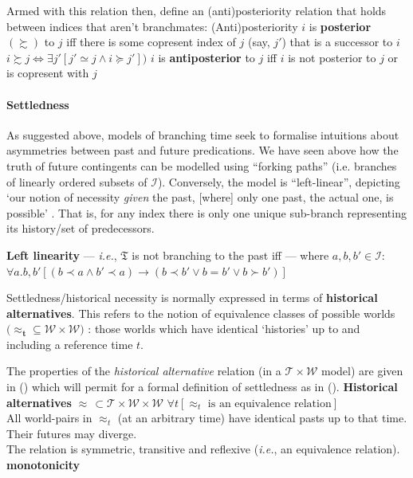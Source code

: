 \documentclass[12pt,dvipsnames]{report}
\begin{document}
Armed with this relation then, \citeauthor{Thomason1980} define an (anti)posteriority relation that holds between indices that aren't branchmates:
\pex (Anti)posteriority \citep[311]{Thomason1980}
\a $ i $ is \textbf{posterior} $ (\boldsymbol\succsim )$ to $ j $ iff there is some copresent index of $ j $ (say, $ j' $) that is a successor to $ i $ \hfill
$i \boldsymbol\succsim j\Leftrightarrow\exists j'[j'\simeq j\wedge i\succcurlyeq j'] )$
\a $ i $ is \textbf{antiposterior} to $ j $ iff $ i $ is not posterior to $ j $ or is copresent with $ j $ \\
\xe

\paragraph{Settledness} As suggested above, models of branching time seek to formalise intuitions about asymmetries between past and future predications. We have seen above how the truth of future contingents can be modelled using ``forking paths'' (i.e. branches of linearly ordered subsets of $ \mathcal I $). Conversely, the model is ``left-linear'', depicting `our notion of necessity \textit{given} the past, [where] only one past, the actual one, is possible' \citep[159]{Burgess1978}. That is, for any index there is only one unique sub-branch representing its history/set of predecessors.\label{par:settledness}

\ex {} \textbf{Left linearity }--- \textit{i.e.}, $ \mathfrak T $ is not branching to the past iff --- where $ a,b,b'\in\mathcal I: $\\
$ \forall a.b,b'[(b\prec a\wedge b'\prec a)\to(b\prec b'\vee b=b'\vee b\succ b')] $\xe

Settledness/historical necessity is normally expressed in terms of \textbf{historical alternatives}. This refers to the notion of equivalence classes of possible worlds $\boldsymbol{(\approx_{t}}\subseteq\mathcal{W\times W})$ : those worlds which have identical `histories' up to and including a reference time $t$. 

The properties of the \textit{historical alternative} relation (in a $ \mathcal{T\times W} $ model) are given in (\nextx) which will permit for a formal definition of settledness as in (\anextx).
	\pex \textbf{Historical alternatives} $\boldsymbol\approx\,\subset\mathcal{T\times W\times W}$
	\a $\forall t[\approx_t\text{ is an equivalence relation}]$\\
	All world-pairs in $\approx_t$ (at an arbitrary time) have identical pasts up to that time.\\Their futures may diverge.\\
	The relation is symmetric, transitive and reflexive (\textit{i.e.}, an equivalence relation).
	\a \textbf{monotonicity}
	
\end{document}
